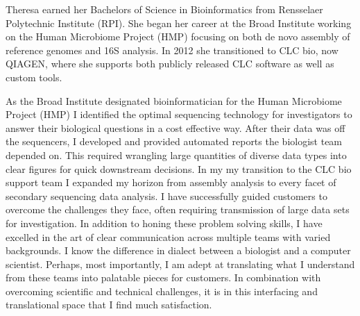 \documentclass[10pt,letterpaper,sigleft]{newlfm}
\begin{document}
\begin{newlfm}




Theresa earned her Bachelors of Science in Bioinformatics from Rensselaer Polytechnic Institute (RPI).  She began her career at the Broad Institute working on the Human Microbiome Project (HMP) focusing on both de novo assembly of reference genomes and 16S analysis. In 2012 she transitioned to CLC bio, now QIAGEN, where she supports both publicly released CLC software as well as custom tools.




As the Broad Institute designated bioinformatician for the Human Microbiome Project (HMP) I identified the optimal sequencing technology for investigators to answer their biological questions in a cost effective way.  After their data was off the sequencers, I developed and provided automated reports the biologist team depended on. This required wrangling large quantities of diverse data types into clear figures for quick downstream decisions. In my my transition to the CLC bio support team I expanded my horizon from assembly analysis to every facet of secondary sequencing data analysis. I have successfully guided customers to overcome the challenges they face, often requiring transmission of large data sets for investigation. In addition to honing these problem solving skills, I have excelled in the art of clear communication across multiple teams with varied backgrounds. I know the difference in dialect between a biologist and a computer scientist. Perhaps, most importantly, I am adept at translating what I understand from these teams into palatable pieces for customers. In combination with overcoming scientific and technical challenges, it is in this interfacing and translational space that I find much satisfaction. 


 

\end{newlfm}
\end{document}
